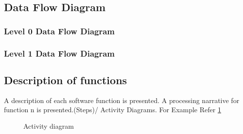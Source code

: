 \documentclass[oneside,a4paper,12pt]{report}
\begin{document}
\subsection{Data Flow Diagram}  
\subsubsection{Level 0 Data Flow Diagram}
\subsubsection{Level 1 Data Flow Diagram}
 
\subsection{Description of functions}  
A description of each software function is presented. A processing narrative for function n is presented.(Steps)/ Activity Diagrams. For Example Refer \ref{fig:act-dig}



\begin{center}
	\begin{figure}[!htbp]
		\centering
	  \caption{Activity diagram}
	  \label{fig:act-dig}
	\end{figure}
\end{center}  
\end{document}

